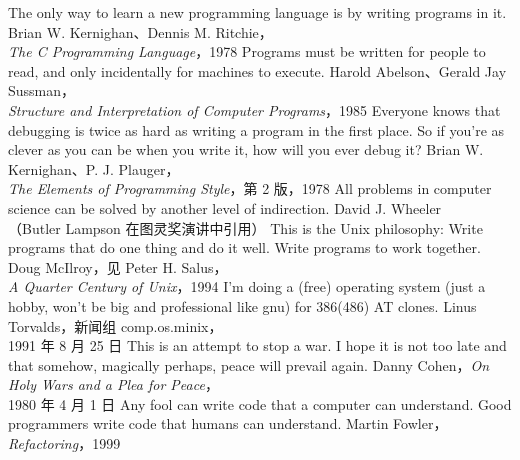              {The only way to learn a new programming language is by writing programs in it.}
             {Brian W. Kernighan、Dennis M. Ritchie，\\\emph{The C Programming Language}，1978}
             {Programs must be written for people to read, and only incidentally for machines to execute.}
             {Harold Abelson、Gerald Jay Sussman，\\\emph{Structure and Interpretation of Computer Programs}，1985}
             {Everyone knows that debugging is twice as hard as writing a program in the first place.
              So if you're as clever as you can be when you write it, how will you ever debug it?}
             {Brian W. Kernighan、P. J. Plauger，\\\emph{The Elements of Programming Style}，第 2 版，1978}
             {All problems in computer science can be solved by another level of indirection.}
             {David J. Wheeler\\（Butler Lampson 在图灵奖演讲中引用）}
             {This is the Unix philosophy: Write programs that do one thing and do it well.
              Write programs to work together.}
             {Doug McIlroy，见 Peter H. Salus，\\\emph{A Quarter Century of Unix}，1994}
             {I'm doing a (free) operating system (just a hobby, won't be big and professional like gnu)
              for 386(486) AT clones.}
             {Linus Torvalds，新闻组 comp.os.minix，\\1991 年 8 月 25 日}
             {This is an attempt to stop a war. I hope it is not too late and that somehow,
              magically perhaps, peace will prevail again.}
             {Danny Cohen，\emph{On Holy Wars and a Plea for Peace}，\\1980 年 4 月 1 日}
             {Any fool can write code that a computer can understand.
              Good programmers write code that humans can understand.}
             {Martin Fowler，\\\emph{Refactoring}，1999}

